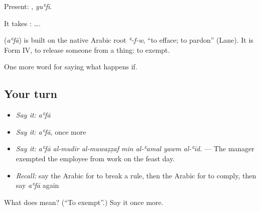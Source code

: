 Present: , \emph{yuʿfī}.

It takes :   ….

\begin{cousinweb}
\textbf{} (\emph{aʿfā}) is built on the native Arabic root \emph{ʿ-f-w}, \textquotedblleft{}to efface; to pardon\textquotedblright{} (Lane). It is Form IV, to release someone from a thing: to exempt.
\end{cousinweb}

\begin{grammarlens}[title={What you've built}]
One more word for saying what happens if.
\end{grammarlens}

\subsection*{Your turn}
\begin{itemize}
\raggedright
  \item \emph{Say it:} \emph{aʿfā}
  \item \emph{Say it:} \emph{aʿfā}, once more
  \item \emph{Say it:} \emph{aʿfā al-mudīr al-muwaẓẓaf min al-ʿamal yawm al-ʿīd.} — The manager exempted the employee from work on the feast day.
  \item \emph{Recall:} say the Arabic for to break a rule, then the Arabic for to comply, then say \emph{aʿfā} again
\end{itemize}

\begin{tcolorbox}[breakable,colback=teal!4,colframe=teal!35!black,title={Before you move on}]
What does  mean? (\textquotedblleft{}To exempt\textquotedblright{}.) Say it once more.
\end{tcolorbox}
